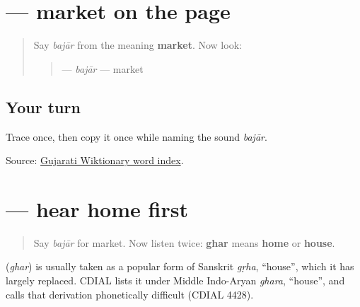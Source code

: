 \section[\texorpdfstring{\gu{બજાર} (bajār)}{બજાર (bajār)}]{ — market on the page}

\label{lesson:GU-C20-bajar}



\begin{quote}
Say \emph{bajār} from the meaning \textbf{market}. Now look:

\begin{quote}
\textbf{} — \emph{bajār} — market
\end{quote}
\end{quote}

\subsection*{Your turn}
Trace \textbf{} once, then copy it once while naming the sound \emph{bajār}.

\begin{tcolorbox}[breakable,colback=teal!4,colframe=teal!35!black,title={Before you move on}]
Source: \href{https://gu.wiktionary.org/wiki/\%E0\%AA\%B5\%E0\%AA\%BF\%E0\%AA\%95\%E0\%AA\%BF\%E0\%AA\%95\%E0\%AB\%8B\%E0\%AA\%B6:\%E0\%AA\%B6\%E0\%AA\%AC\%E0\%AB\%8D\%E0\%AA\%A6\_\%E0\%AA\%85\%E0\%AA\%A8\%E0\%AB\%81\%E0\%AA\%95\%E0\%AB\%8D\%E0\%AA\%B0\%E0\%AA\%AE\%E0\%AA\%A3\%E0\%AA\%BF\%E0\%AA\%95\%E0\%AA\%BE}{Gujarati Wiktionary word index}.
\end{tcolorbox}
\section[\texorpdfstring{\gu{ઘર} (ghar)}{ઘર (ghar)}]{ — hear home first}

\label{lesson:GU-C20-hear-ghar}



\begin{quote}
Say \emph{bajār} for market. Now listen twice: \textbf{ghar} means \textbf{home} or \textbf{house}.
\end{quote}

\begin{cousinweb}
\textbf{} (\emph{ghar}) is usually taken as a popular form of Sanskrit \emph{gṛha}, \textquotedblleft{}house\textquotedblright{}, which it has largely replaced. CDIAL lists it under Middle Indo-Aryan \emph{ghara}, \textquotedblleft{}house\textquotedblright{}, and calls that derivation phonetically difficult (CDIAL 4428).
\end{cousinweb}

